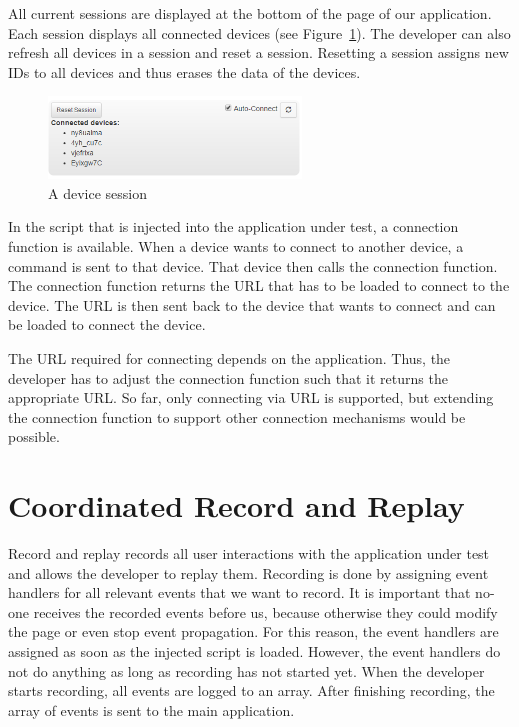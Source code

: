 All current sessions are displayed at the bottom of the page of our application. Each session displays all connected devices (see Figure~\ref{fig:sessions}). The developer can also refresh all devices in a session and reset a session. Resetting a session assigns new IDs to all devices and thus erases the data of the devices. 

\begin{figure}[H]
  \centering
    \includegraphics[width=0.6\textwidth]{images/screenshots/session_management.png}
	\caption[Screenshot: Session]{A device session}
	\label{fig:sessions}
\end{figure}

In the script that is injected into the application under test, a connection function is available. When a device wants to connect to another device, a command is sent to that device. That device then calls the connection function. The connection function returns the URL that has to be loaded to connect to the device. The URL is then sent back to the device that wants to connect and can be loaded to connect the device.

The URL required for connecting depends on the application. Thus, the developer has to adjust the connection function such that it returns the appropriate URL. So far, only connecting via URL is supported, but extending the connection function to support other connection mechanisms would be possible.

\section{Coordinated Record and Replay}

Record and replay records all user interactions with the application under test and allows the developer to replay them. Recording is done by assigning event handlers for all relevant events that we want to record. It is important that no-one receives the recorded events before us, because otherwise they could modify the page or even stop event propagation. For this reason, the event handlers are assigned as soon as the injected script is loaded. However, the event handlers do not do anything as long as recording has not started yet. When the developer starts recording, all events are logged to an array. After finishing recording, the array of events is sent to the main application. 

